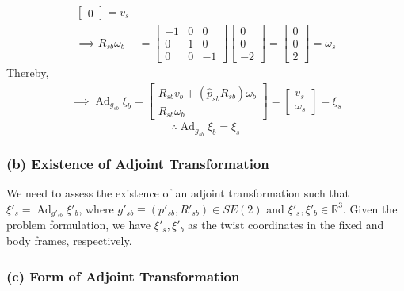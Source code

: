 \begin{align*}
\begin{bmatrix}
        0
    \end{bmatrix}
    =
    v_s
    \\
    \implies
    R_{s b} \omega_b
     & =
    \begin{bmatrix}
        -1 & 0 & 0  \\
        0  & 1 & 0  \\
        0  & 0 & -1
    \end{bmatrix}
    \begin{bmatrix}
        0 \\
        0 \\
        -2
    \end{bmatrix}
    =
    \begin{bmatrix}
        0 \\
        0 \\
        2
    \end{bmatrix}
    =
    \omega_s
\end{align*}
Thereby,
\begin{align*}
    \implies
    \operatorname{Ad}_{g_{s b}} \xi_{b}
    =
    \begin{bmatrix}
        R_{s b} v_b + (\widehat{p}_{s b} R_{s b}) \omega_b \\
        R_{s b} \omega_b
    \end{bmatrix}
    =
    \begin{bmatrix}
        v_s \\
        \omega_s
    \end{bmatrix}
    =
    \xi_s
\end{align*}
\begin{equation*}
    \therefore
    \boxed{
    \operatorname{Ad}_{g_{s b}} \xi_{b}
    =
    \xi_s
    }
\end{equation*}

\subsubsection*{(b) Existence of Adjoint Transformation}

We need to assess the existence of an adjoint transformation such that \( \xi'_s = \operatorname{Ad}_{g'_{s b}} \xi'_b \), where \( g'_{s b} \equiv (p'_{s b}, R'_{s b}) \in SE(2) \) and \( \xi'_s, \xi'_b \in \mathbb{R}^3 \).
Given the problem formulation, we have \( \xi'_s, \xi'_b \) as the twist coordinates in the fixed and body frames, respectively.

\subsubsection*{(c) Form of Adjoint Transformation}

